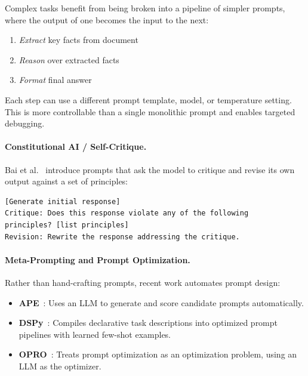 Complex tasks benefit from being broken into a pipeline of simpler prompts, where the output of one becomes the input to the next:

\begin{enumerate}
  \item \emph{Extract} key facts from document
  \item \emph{Reason} over extracted facts
  \item \emph{Format} final answer
\end{enumerate}

Each step can use a different prompt template, model, or temperature setting. This is more controllable than a single monolithic prompt and enables targeted debugging.

\paragraph{Constitutional AI / Self-Critique.}
\label{constitutional-ai-self-critique.}

Bai et al.~\cite{bai2022constitutional} introduce prompts that ask the model to critique and revise its own output against a set of principles:

\begin{lstlisting}
[Generate initial response]
Critique: Does this response violate any of the following 
principles? [list principles]
Revision: Rewrite the response addressing the critique.
\end{lstlisting}

\paragraph{Meta-Prompting and Prompt Optimization.}
\label{meta-prompting-and-prompt-optimization.}

Rather than hand-crafting prompts, recent work automates prompt design:

\begin{itemize}
  \item \textbf{APE}~\cite{zhou2023large}: Uses an LLM to generate and score candidate prompts automatically.
  \item \textbf{DSPy}~\cite{khattab2023dspy}: Compiles declarative task descriptions into optimized prompt pipelines with learned few-shot examples.
  \item \textbf{OPRO}~\cite{yang2024large}: Treats prompt optimization as an optimization problem, using an LLM as the optimizer.
\end{itemize}

